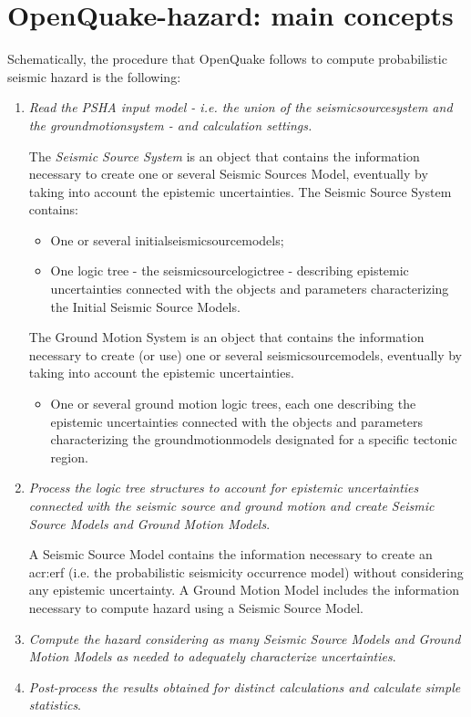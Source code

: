 \section{OpenQuake-hazard: main concepts}
Schematically, the procedure that OpenQuake follows to compute probabilistic 
seismic hazard is the following:
%
\begin{enumerate}
%
\item \emph{Read the PSHA input model - i.e. the union of the 
\gls{seismicsourcesystem} and the \gls{groundmotionsystem} - 
and calculation settings.}
	
	The \emph{Seismic Source System} is an object that contains the 
	information necessary to create one or several Seismic Sources Model, 
	eventually by taking into account the epistemic uncertainties. 
	The Seismic Source System contains:
	\begin{itemize}
	\item One or several \glspl{initialseismicsourcemodel};
	\item One logic tree - the \gls{seismicsourcelogictree} - describing 
	epistemic uncertainties connected with the objects and parameters 
	characterizing the Initial Seismic Source Models.
	\end{itemize}
	
	The Ground Motion System is an object that contains the information 
	necessary to create (or use) one or several \glspl{seismicsourcemodel}, 
	eventually by taking into account the epistemic uncertainties. 
	\begin{itemize}
	\item One or several ground motion logic trees, each one describing 
	the epistemic uncertainties connected with the objects and parameters 
	characterizing the \glspl{groundmotionmodel} designated for a specific 
	tectonic region.
	\end{itemize}

%
\item \emph{Process the logic tree structures to account for epistemic 
uncertainties connected with the seismic source and ground motion and
create Seismic Source Models and Ground Motion Models}.
	
	A Seismic Source Model contains the information necessary to create an 
	\gls{acr:erf} (i.e. the probabilistic seismicity occurrence
	model) without con\-sid\-er\-ing any epistemic uncertainty.
	A Ground Motion Model includes the information 
	necessary to compute hazard using a Seismic Source Model. 
\item \emph{Compute the hazard considering as many Seismic Source Models and 
Ground Motion Models as needed to adequately characterize uncertainties}.
\item \emph{Post-process the results obtained for distinct calculations and
calculate simple statistics}.
\end{enumerate}
%
